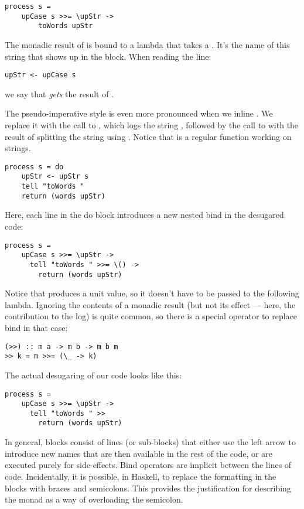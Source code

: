 \begin{Verbatim}
process s = 
    upCase s >>= \upStr ->
        toWords upStr
\end{Verbatim}
The monadic result of  is bound to a lambda that takes a
. It's the name of this string that shows up in the
 block. When reading the line:

\begin{Verbatim}
upStr <- upCase s
\end{Verbatim}
we say that  \emph{gets} the result of .

The pseudo-imperative style is even more pronounced when we inline
. We replace it with the call to , which
logs the string , followed by the call to
 with the result of splitting the string 
using . Notice that  is a regular function
working on strings.

\begin{Verbatim}
process s = do
    upStr <- upStr s
    tell "toWords "
    return (words upStr)
\end{Verbatim}
Here, each line in the do block introduces a new nested bind in the
desugared code:

\begin{Verbatim}
process s =
    upCase s >>= \upStr ->
      tell "toWords " >>= \() ->
        return (words upStr)
\end{Verbatim}
Notice that  produces a unit value, so it doesn't have to
be passed to the following lambda. Ignoring the contents of a monadic
result (but not its effect --- here, the contribution to the log) is
quite common, so there is a special operator to replace bind in that
case:

\begin{Verbatim}
(>>) :: m a -> m b -> m b m
>> k = m >>= (\_ -> k)
\end{Verbatim}
The actual desugaring of our code looks like this:

\begin{Verbatim}
process s =
    upCase s >>= \upStr ->
      tell "toWords " >>
        return (words upStr)
\end{Verbatim}
In general,  blocks consist of lines (or sub-blocks) that
either use the left arrow to introduce new names that are then available
in the rest of the code, or are executed purely for side-effects. Bind
operators are implicit between the lines of code. Incidentally, it is
possible, in Haskell, to replace the formatting in the 
blocks with braces and semicolons. This provides the justification for
describing the monad as a way of overloading the semicolon.

